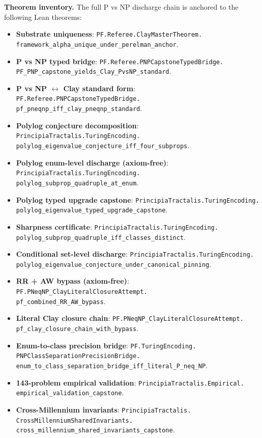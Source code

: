 \documentclass[11pt,a4paper]{article}
\theoremstyle{plain}
\theoremstyle{definition}
\begin{document}
\medskip

\noindent\textbf{Theorem inventory.} The full P vs NP discharge
chain is anchored to the following Lean theorems:

\begin{itemize}[leftmargin=*,nosep]
\item \textbf{Substrate uniqueness}:
\texttt{PF.Referee.ClayMasterTheorem.\\
framework\_alpha\_unique\_under\_perelman\_anchor}.
\item \textbf{P vs NP typed bridge}:
\texttt{PF.Referee.PNPCapstoneTypedBridge.\\
PF\_PNP\_capstone\_yields\_Clay\_PvsNP\_standard}.
\item \textbf{P vs NP $\leftrightarrow$ Clay standard form}:
\texttt{PF.Referee.PNPCapstoneTypedBridge.\\
pf\_pneqnp\_iff\_clay\_pneqnp\_standard}.
\item \textbf{Polylog conjecture decomposition}:
\texttt{PrincipiaTractalis.TuringEncoding.\\
polylog\_eigenvalue\_conjecture\_iff\_four\_subprops}.
\item \textbf{Polylog enum-level discharge (axiom-free)}:
\texttt{PrincipiaTractalis.TuringEncoding.\\
polylog\_subprop\_quadruple\_at\_enum}.
\item \textbf{Polylog typed upgrade capstone}:
\texttt{PrincipiaTractalis.TuringEncoding.\\
polylog\_eigenvalue\_typed\_upgrade\_capstone}.
\item \textbf{Sharpness certificate}:
\texttt{PrincipiaTractalis.TuringEncoding.\\
polylog\_subprop\_quadruple\_iff\_classes\_distinct}.
\item \textbf{Conditional set-level discharge}:
\texttt{PrincipiaTractalis.TuringEncoding.\\
polylog\_eigenvalue\_conjecture\_under\_canonical\_pinning}.
\item \textbf{RR + AW bypass (axiom-free)}:
\texttt{PF.PNeqNP\_ClayLiteralClosureAttempt.\\
pf\_combined\_RR\_AW\_bypass}.
\item \textbf{Literal Clay closure chain}:
\texttt{PF.PNeqNP\_ClayLiteralClosureAttempt.\\
pf\_clay\_closure\_chain\_with\_bypass}.
\item \textbf{Enum-to-class precision bridge}:
\texttt{PF.TuringEncoding.\\
PNPClassSeparationPrecisionBridge.\\
enum\_to\_class\_separation\_bridge\_iff\_literal\_P\_neq\_NP}.
\item \textbf{143-problem empirical validation}:
\texttt{PrincipiaTractalis.Empirical.\\
empirical\_validation\_capstone}.
\item \textbf{Cross-Millennium invariants}:
\texttt{PrincipiaTractalis.\\
CrossMillenniumSharedInvariants.\\
cross\_millennium\_shared\_invariants\_capstone}.
\end{itemize}
\end{document}
